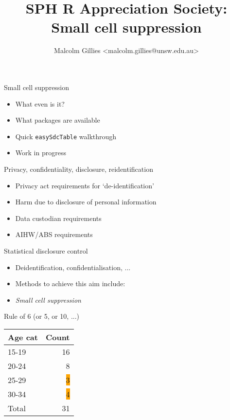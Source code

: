 \documentclass[aspectratio=169,12pt]{beamer} %
\title{SPH R Appreciation Society:\\Small cell suppression}
\author{Malcolm Gillies <malcolm.gillies@unsw.edu.au>}
\institute{25 February 2025}
\begin{document}

\begin{frame}[plain]
\titlepage
\end{frame}

\begin{frame}{Small cell suppression}
	\begin{itemize}
		\item What even is it?
		\item What packages are available
		\item Quick \texttt{easySdcTable} walkthrough
		\item Work in progress
	\end{itemize}
\end{frame}

\begin{frame}{Privacy, confidentiality, disclosure, reidentification}
	\begin{itemize}
		\item Privacy act requirements for `de-identification'
		\item Harm due to disclosure of personal information
		\item Data custodian requirements
		\item AIHW/ABS requirements
	\end{itemize}
\end{frame}

\begin{frame}{Statistical disclosure control}
	\begin{itemize}
		\item Deidentification, confidentialisation, ...
		\item Methods to achieve this aim include:
		\item \emph{Small cell suppression}
	\end{itemize}
\end{frame}

\begin{frame}{Rule of 6 (or 5, or 10, ...)}
	\center
	\begin{tabular}{lr}
	Age cat & Count \\
	\hline
	15-19 & 16 \\
	20-24 & 8 \\
	25-29 & \colorbox{orange}{3} \\
	30-34 & \colorbox{orange}{4} \\
	Total & 31 \\
	\hline
	\end{tabular}
\end{frame}
\end{document}
